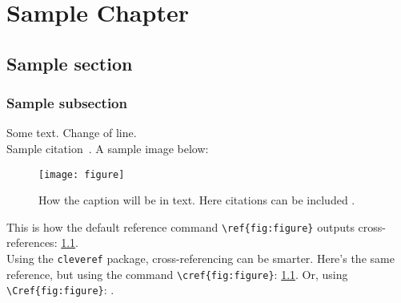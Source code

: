 \documentclass[../main/Progress.tex]{subfiles}
\begin{document}
	\chapter[Sample Chapter]{Sample Chapter}
	\section{Sample section}
	\subsection{Sample subsection}
	Some text. 
	Change of line.\\
	Sample citation~\cite{Fiat:1987}. 
	A sample image below:
	\begin{figure}[h]
		\centering
		\texttt{[image: figure]}
		\caption[How the caption will appear in the list of figures]{How the caption will be in text. Here citations can be included \cite{Fiat:1987}.}
		\label{fig:figure}
	\end{figure}


This is how the default reference command \verb|\ref{fig:figure}| outputs cross-references: \ref{fig:figure}.\\
Using the \verb|cleveref| package, cross-referencing can be smarter. 
Here's the same reference, but using the command \verb|\cref{fig:figure}|: \cref{fig:figure}.
Or, using \verb|\Cref{fig:figure}|: .


	
\end{document}
